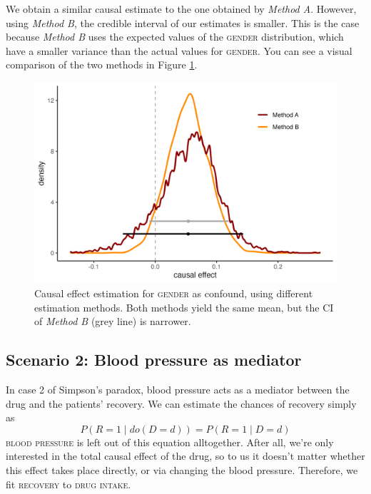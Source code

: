 \documentclass[nobib]{tufte-handout}
\newcommand{\mathdo}{\mathit{do}}
\begin{document}
We obtain a similar causal estimate to the one obtained by \emph{Method A}.
However, using \emph{Method B}, the credible interval of our estimates is smaller.
This is the case because \emph{Method B} uses the expected values of the \textsc{gender} distribution, which have a smaller variance than the actual values for \textsc{gender}.
You can see a visual comparison of the two methods in Figure \ref{fig:gender}.
\begin{figure}
    \centering
    \includegraphics[width=0.8\linewidth]{../img/gender_estimation_comparison.png}
    \caption{Causal effect estimation for \textsc{gender} as confound, using different estimation methods. Both methods yield the same mean, but the CI of \emph{Method B} (grey line) is narrower.}
    \label{fig:gender}
\end{figure}


\subsection{Scenario 2: Blood pressure as mediator}
In case 2 of Simpson’s paradox, blood pressure acts as a mediator between the drug and the patients’ recovery. 
We can estimate the chances of recovery simply as
$$P\left(R=1\mid \mathdo(D=d)\right)=P\left(R=1\mid D=d\right)$$
\textsc{blood pressure} is left out of this equation alltogether. 
After all, we’re only interested in the total causal effect of the drug, so to us it doesn't matter whether this effect takes place directly, or via changing the blood pressure.
Therefore, we fit \textsc{recovery} to \textsc{drug intake}.
\end{document}
